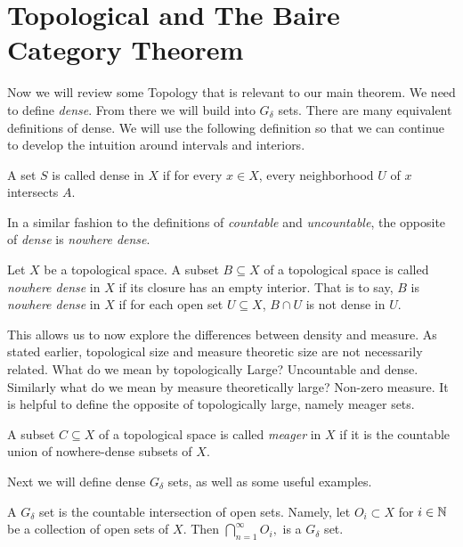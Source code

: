 \section{Topological and The Baire Category Theorem}
Now we will review some Topology that is relevant to our main theorem.  We need to define \textit{dense}.  From there we will build into $G_\delta$ sets.     There are many equivalent definitions of dense.  We will use the following definition so that we can continue to develop the intuition around intervals and interiors. 

\begin{definition}[Dense]
    A set $S$ is called dense in $X$ if for every $x \in X$, every neighborhood $U$ of $x$ intersects $A$.  
\end{definition}


In a similar fashion to the definitions of \textit{countable} and \textit{uncountable}, the opposite of \textit{dense} is \textit{nowhere dense}.

\begin{definition}  Let $X$ be a topological space.  A subset $B \subseteq X$ of a topological space is called \textit{nowhere dense} in $X$ if its closure has an empty interior.  That is to say, $B$ is \textit{nowhere dense} in $X$ if for each open set $U\subseteq X$, $B\cap U$ is not dense in $U$.      
\end{definition}



This allows us to now explore the differences between density and measure.  As stated earlier, topological size and measure theoretic size are not necessarily related.  What do we mean by topologically Large? Uncountable and dense.  Similarly what do we mean by measure theoretically large?  Non-zero measure. It is helpful to define the opposite of topologically large, namely meager sets.



\begin{definition}[Meager]  A subset $C \subseteq X$ of a topological space is called \textit{meager} in $X$ if it is the countable union of nowhere-dense subsets of $X$.    
\end{definition}

Next we will define dense $G_\delta$ sets, as well as some useful examples.  
\begin{definition}
    A $G_\delta$ set is the countable intersection of open sets.  Namely, let $O_i \subset X$ for $i \in \mathbb{N}$ be a collection of open sets of $X$.  Then 
    $\bigcap_{n=1}^\infty O_i,$ is a $G_\delta$ set.  
\end{definition}

